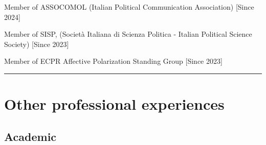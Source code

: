 \documentclass[10pt,]{article}
\renewenvironment{itemize}{
  \begin{list}{}{
    \setlength{\leftmargin}{1.5em}
  }
}{
  \end{list}
}
\begin{document}
\begin{itemize}
\item
  Member of ASSOCOMOL (Italian Political Communication Association)
  {[}Since 2024{]}
\item
  Member of SISP, (Società Italiana di Scienza Politica - Italian
  Political Science Society) {[}Since 2023{]}
\item
  Member of ECPR Affective Polarization Standing Group {[}Since 2023{]}

  \bigskip \hrule
\end{itemize}

\section{Other professional
experiences}\label{other-professional-experiences}

\subsection{Academic}\label{academic}
\end{document}
